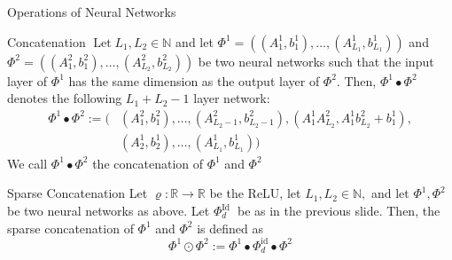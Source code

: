 \documentclass{if-beamer}
\begin{document}
\begin{frame}{Operations of Neural Networks}
    \begin{block}{Concatenation}
        {\small
        $\operatorname{Let} L_{1}, L_{2} \in \mathbb{N}$ and let $\Phi^{1}=\left(\left(A_{1}^{1}, b_{1}^{1}\right), \ldots,\left(A_{L_{1}}^{1}, b_{L_{1}}^{1}\right)\right)$ and $\Phi^{2}=\left(\left(A_{1}^{2}, b_{1}^{2}\right), \ldots,\left(A_{L_{2}}^{2}, b_{L_{2}}^{2}\right)\right)$
        be two neural networks such that the input layer of $\Phi^{1}$ has the same dimension as the output layer of
        $\Phi^{2} .$ Then, $\Phi^{1} \bullet \Phi^{2}$ denotes the following $L_{1}+L_{2}-1$ layer network:
        \begin{align*}
            \Phi^{1} \bullet \Phi^{2}:=\big(&\left(A_{1}^{2}, b_{1}^{2}\right), \ldots,\left(A_{L_{2}-1}^{2}, b_{L_{2}-1}^{2}\right),\left(A_{1}^{1} A_{L_{2}}^{2}, A_{1}^{1} b_{L_{2}}^{2}+b_{1}^{1}\right), \\
            &\left(A_{2}^{1}, b_{2}^{1}\right), \ldots,\left(A_{L_{1}}^{1}, b_{L_{1}}^{1}\right)\big)
        \end{align*}
        We call $\Phi^{1} \bullet \Phi^{2}$ the concatenation of $\Phi^{1}$ and $\Phi^{2}$
        }
    \end{block}
    \begin{block}{Sparse Concatenation}
        {\small
        Let $\varrho: \mathbb{R} \rightarrow \mathbb{R}$ be the ReLU, let $L_{1}, L_{2} \in \mathbb{N},$ and let $\Phi^{1}, \Phi^{2}$ be two neural networks as above. Let $\Phi_{d}^{\text {Id }}$ be as in the previous slide. Then, the sparse concatenation of
        $\Phi^{1}$ and $\Phi^{2}$ is defined as
        \[
        \Phi^{1} \odot \Phi^{2}:=\Phi^{1} \bullet \Phi_{d}^{\mathrm{id}} \bullet \Phi^{2}
        \]
        }
    \end{block}
\end{frame}
\end{document}
